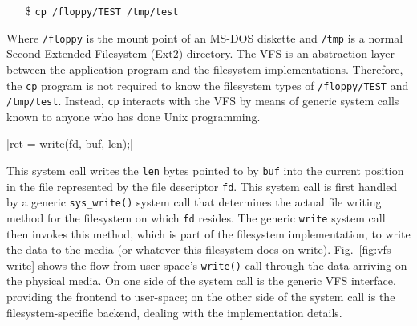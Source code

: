 \begin{frame}
  \begin{itemize}
  \item[\$] \texttt{cp /floppy/TEST /tmp/test}
  \end{itemize}
  \vspace{2em}
  \begin{minipage}{.3\linewidth}
    \begin{center}
       
    \end{center}
  \end{minipage}\quad
  \begin{minipage}{.65\linewidth}
    \begin{center}
    \end{center}
  \end{minipage}
\end{frame}

Where \texttt{/floppy} is the mount point of an MS-DOS diskette and \texttt{/tmp} is a
normal Second Extended Filesystem (Ext2) directory. The VFS is an abstraction layer
between the application program and the filesystem implementations. Therefore, the
\texttt{cp} program is not required to know the filesystem types of \texttt{/floppy/TEST}
and \texttt{/tmp/test}. Instead, \texttt{cp} interacts with the VFS by means of generic
system calls known to anyone who has done Unix
programming.

\begin{frame}[fragile]
  |ret = write(fd, buf, len);|
  \begin{center}
     
  \end{center}
\end{frame}

This system call writes the \texttt{len} bytes pointed to by \texttt{buf} into the current
position in the file represented by the file descriptor \texttt{fd}. This system call is
first handled by a generic \verb|sys_write()| system call that determines the actual file
writing method for the filesystem on which \texttt{fd} resides. The generic \texttt{write}
system call then invokes this method, which is part of the filesystem implementation, to
write the data to the media (or whatever this filesystem does on
write). Fig.~\ref{fig:vfs-write} shows the flow from user-space's \texttt{write()} call
through the data arriving on the physical media. On one side of the system call is the
generic VFS interface, providing the frontend to user-space; on the other side of the
system call is the filesystem-specific backend, dealing with the implementation
details.

